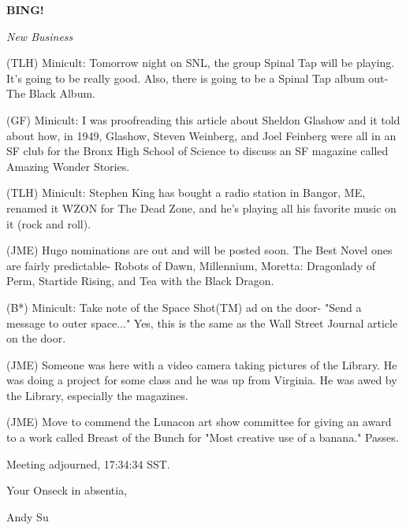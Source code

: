 \documentclass[12pt]{article}
\newcommand{\bing}{{\bf BING!} }
\newcommand{\goto}[1]{\bing \vskip 12pt \centerline{{\em{#1}}}}
\begin{document}
\goto{New Business}

(TLH) Minicult: Tomorrow night on SNL, the group Spinal Tap will be playing. It's going to be really good. Also, there is going to be a Spinal Tap album out- The Black Album.

(GF) Minicult: I was proofreading this article about Sheldon Glashow and it told about how, in 1949, Glashow, Steven Weinberg, and Joel Feinberg were all in an SF club for the Bronx High School of Science to discuss an SF magazine called Amazing Wonder Stories.

(TLH) Minicult: Stephen King has bought a radio station in Bangor, ME, renamed it WZON for The Dead Zone, and he's playing all his favorite music on it (rock and roll).

(JME) Hugo nominations are out and will be posted soon. The Best Novel ones are fairly predictable- Robots of Dawn, Millennium, Moretta: Dragonlady of Perm, Startide Rising, and Tea with the Black Dragon.

(B*) Minicult: Take note of the Space Shot(TM) ad on the door- "Send a message to outer space..." Yes, this is the same as the Wall Street Journal article on the door.

(JME) Someone was here with a video camera taking pictures of the Library. He was doing a project for some class and he was up from Virginia. He was awed by the Library, especially the magazines.

(JME) Move to commend the Lunacon art show committee for giving an award to a work called Breast of the Bunch for "Most creative use of a banana." Passes.

\vspace{12pt}

\noindent
Meeting adjourned, 17:34:34 SST.

\vspace{18pt}

\centerline{Your Onseck in absentia,}
\centerline{Andy Su}
\end{document}
